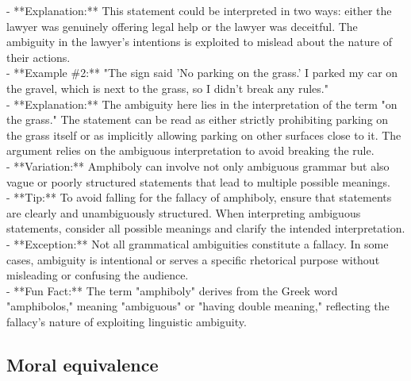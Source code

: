 \documentclass[a4paper,12pt,single,pdftex]{scrartcl}
\begin{document}
    
      - **Explanation:** This statement could be interpreted in two ways: either the lawyer was genuinely offering legal help or the lawyer was deceitful. The ambiguity in the lawyer's intentions is exploited to mislead about the nature of their actions.
    \\

    
      - **Example \#2:** "The sign said 'No parking on the grass.' I parked my car on the gravel, which is next to the grass, so I didn't break any rules."
    \\

    
      - **Explanation:** The ambiguity here lies in the interpretation of the term "on the grass." The statement can be read as either strictly prohibiting parking on the grass itself or as implicitly allowing parking on other surfaces close to it. The argument relies on the ambiguous interpretation to avoid breaking the rule.
    \\

    
      - **Variation:** Amphiboly can involve not only ambiguous grammar but also vague or poorly structured statements that lead to multiple possible meanings.
    \\

    
      - **Tip:** To avoid falling for the fallacy of amphiboly, ensure that statements are clearly and unambiguously structured. When interpreting ambiguous statements, consider all possible meanings and clarify the intended interpretation.
    \\

    
      - **Exception:** Not all grammatical ambiguities constitute a fallacy. In some cases, ambiguity is intentional or serves a specific rhetorical purpose without misleading or confusing the audience.
    \\

    
      - **Fun Fact:** The term "amphiboly" derives from the Greek word "amphibolos," meaning "ambiguous" or "having double meaning," reflecting the fallacy's nature of exploiting linguistic ambiguity.
    \\

  \subsection{Moral equivalence}
\end{document}
